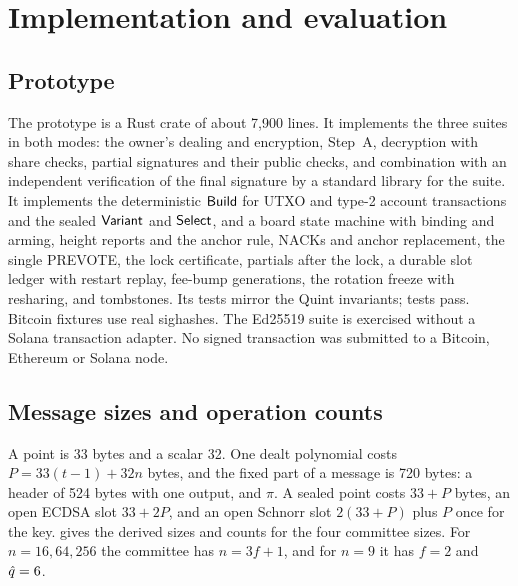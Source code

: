 \section{Implementation and evaluation}\label{sec:eval}

\subsection{Prototype}

The prototype is a Rust crate of about 7{,}900 lines. It implements the three suites in both modes: the owner's dealing and encryption, Step~A, decryption with share checks, partial signatures and their public checks, and combination with an independent verification of the final signature by a standard library for the suite. It implements the deterministic $\mathsf{Build}$ for UTXO and type-2 account transactions and the sealed $\mathsf{Variant}$ and $\mathsf{Select}$, and a board state machine with binding and arming, height reports and the anchor rule, NACKs and anchor replacement, the single PREVOTE, the lock certificate, partials after the lock, a durable slot ledger with restart replay, fee-bump generations, the rotation freeze with resharing, and tombstones. Its tests mirror the Quint invariants; \implTestsPassed{} tests pass. Bitcoin fixtures use real sighashes. The Ed25519 suite is exercised without a Solana transaction adapter. No signed transaction was submitted to a Bitcoin, Ethereum or Solana node.

\subsection{Message sizes and operation counts}

A point is 33 bytes and a scalar 32. One dealt polynomial costs $P = 33(t-1) + 32n$ bytes, and the fixed part of a message is 720 bytes: a header of 524 bytes with one output, and $\pi$. A sealed point costs $33 + P$ bytes, an open ECDSA slot $33 + 2P$, and an open Schnorr slot $2(33 + P)$ plus $P$ once for the key.  gives the derived sizes and counts for the four committee sizes. For $n = 16, 64, 256$ the committee has $n = 3f+1$, and for $n = 9$ it has $f = 2$ and $\hat{q} = 6$.

